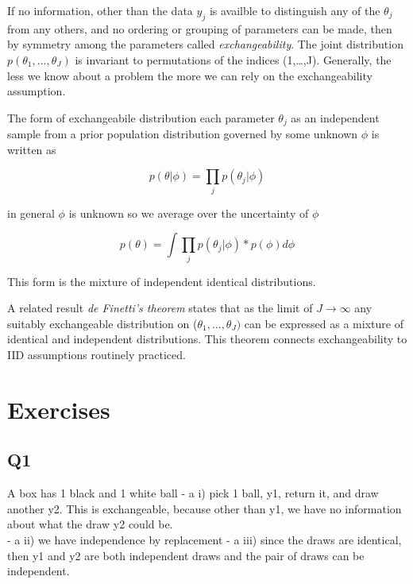 \documentclass[
]{book}
\theoremstyle{definition}
\theoremstyle{definition}
\theoremstyle{definition}
\theoremstyle{definition}
\theoremstyle{remark}
\begin{document}
If no information, other than the data \(y_j\) is availble to distinguish any of the \(\theta_j\) from any others, and no ordering or grouping of parameters can be made, then by symmetry among the parameters called \emph{exchangeability}.
The joint distribution \(p(\theta_1,...,\theta_J)\) is invariant to permutations of the indices (1,\ldots,J). Generally, the less we know about a problem the more we can rely on the exchangeability assumption.

The form of exchangeabile distribution each parameter \(\theta_j\) as an independent sample from a prior population distribution governed by some unknown \(\phi\) is written as

\begin{equation}
p(\theta|\phi) = \prod_j p(\theta_j| \phi)
\end{equation}

in general \(\phi\) is unknown so we average over the uncertainty of \(\phi\)

\begin{equation}
p(\theta) = \int \prod_j p(\theta_j| \phi)* p(\phi)d\phi
\end{equation}

This form is the mixture of independent identical distributions.

A related result \emph{de Finetti's theorem} states that as the limit of \(J\to \infty\) any suitably exchangeable distribution on (\(\theta_1,...,\theta_J)\) can be expressed as a mixture of identical and independent distributions. This theorem connects exchangeability to IID assumptions routinely practiced.

\hypertarget{exercises-4}{%
\section*{Exercises}\label{exercises-4}}

\hypertarget{q1}{%
\subsection*{Q1}\label{q1}}

A box has 1 black and 1 white ball
- a i) pick 1 ball, y1, return it, and draw another y2. This is exchangeable, because other than y1, we have no information about what the draw y2 could be.\\
- a ii) we have independence by replacement
- a iii) since the draws are identical, then y1 and y2 are both independent draws and the pair of draws can be independent.
\end{document}
